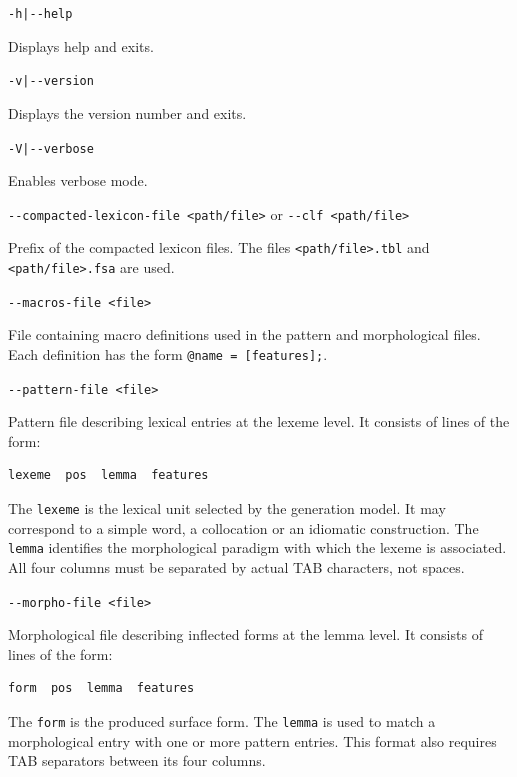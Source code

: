 \documentclass[11pt]{article}
\begin{document}
\begin{description}
	\item \verb#-h|--help#

	      Displays help and exits.

	\item \verb#-v|--version#

	      Displays the version number and exits.

	\item \verb#-V|--verbose#

	      Enables verbose mode.

	\item \verb#--compacted-lexicon-file <path/file># or \verb#--clf <path/file>#

	      Prefix of the compacted lexicon files. The files
	      \verb#<path/file>.tbl# and \verb#<path/file>.fsa# are used.

	\item \verb#--macros-file <file>#

	      File containing macro definitions used in the pattern and
		      morphological files.  Each definition has the form
		      \verb#@name = [features];#.

	\item \verb#--pattern-file <file>#

	      Pattern file describing lexical entries at the lexeme level. It
	      consists of lines of the form:

	      \begin{lstlisting}[frame=none, numbers=none]
lexeme  pos  lemma  features
\end{lstlisting}

	      The \verb#lexeme# is the lexical unit selected by the generation
	      model. It may correspond to a simple word, a collocation or an
	      idiomatic construction. The \verb#lemma# identifies the morphological
	      paradigm with which the lexeme is associated. All four columns
	      must be separated by actual TAB characters, not spaces.

	\item \verb#--morpho-file <file>#

	      Morphological file describing inflected forms at the lemma level. It
	      consists of lines of the form:

	      \begin{lstlisting}[frame=none, numbers=none]
form  pos  lemma  features
\end{lstlisting}

	      The \verb#form# is the produced surface form. The \verb#lemma# is used
	      to match a morphological entry with one or more pattern entries.
	      This format also requires TAB separators between its four columns.
\end{description}
\end{document}

